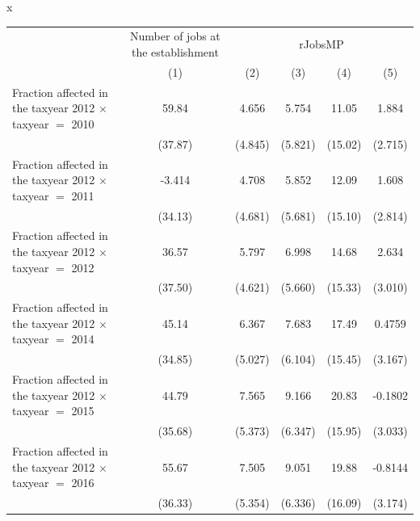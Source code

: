 x
\begingroup
\centering
\begin{tabular}{lccccc}
   \toprule
    & Number of jobs at the establishment & \multicolumn{4}{c}{rJobsMP}\\
                                                                    & (1)           & (2)           & (3)           & (4)           & (5)\\  
   \midrule 
   Fraction affected in the taxyear 2012 $\times$ taxyear $=$ 2010  & 59.84         & 4.656         & 5.754         & 11.05         & 1.884\\   
                                                                    & (37.87)       & (4.845)       & (5.821)       & (15.02)       & (2.715)\\   
   Fraction affected in the taxyear 2012 $\times$ taxyear $=$ 2011  & -3.414        & 4.708         & 5.852         & 12.09         & 1.608\\   
                                                                    & (34.13)       & (4.681)       & (5.681)       & (15.10)       & (2.814)\\   
   Fraction affected in the taxyear 2012 $\times$ taxyear $=$ 2012  & 36.57         & 5.797         & 6.998         & 14.68         & 2.634\\   
                                                                    & (37.50)       & (4.621)       & (5.660)       & (15.33)       & (3.010)\\   
   Fraction affected in the taxyear 2012 $\times$ taxyear $=$ 2014  & 45.14         & 6.367         & 7.683         & 17.49         & 0.4759\\   
                                                                    & (34.85)       & (5.027)       & (6.104)       & (15.45)       & (3.167)\\   
   Fraction affected in the taxyear 2012 $\times$ taxyear $=$ 2015  & 44.79         & 7.565         & 9.166         & 20.83         & -0.1802\\   
                                                                    & (35.68)       & (5.373)       & (6.347)       & (15.95)       & (3.033)\\   
   Fraction affected in the taxyear 2012 $\times$ taxyear $=$ 2016  & 55.67         & 7.505         & 9.051         & 19.88         & -0.8144\\   
                                                                    & (36.33)       & (5.354)       & (6.336)       & (16.09)       & (3.174)\\   

\end{tabular}
